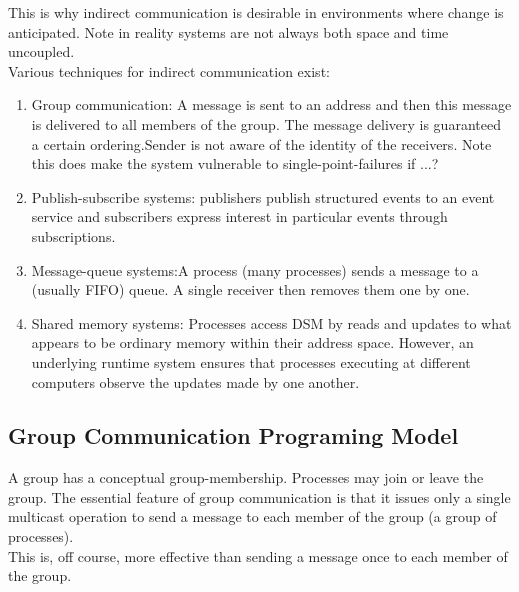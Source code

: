 This is why indirect communication is desirable in environments where change is anticipated. Note in reality systems are not always both space and time uncoupled. \\


Various techniques for indirect communication exist:\\

\begin{enumerate}
\item Group communication: A message is sent to an address  and then this message is delivered to all members of the group. The message delivery is guaranteed a certain ordering.Sender is not aware of the identity of the receivers. Note this does make the system vulnerable to single-point-failures if ...? \\

\item Publish-subscribe systems: publishers publish structured events to an event service and subscribers express interest in particular events through  subscriptions. \\

\item Message-queue systems:A process (many processes) sends a message to a (usually FIFO) queue. A single receiver then removes them one by one.\\

\item Shared memory systems: Processes access DSM by reads and updates to what appears to be ordinary memory within their address space. However, an underlying runtime system ensures that processes executing at different computers observe the updates made by one another.\\
\end{enumerate}

\subsection{Group Communication Programing Model}

A group has a conceptual group-membership. Processes may join or leave the group. The essential feature of group communication is that it issues only a single multicast operation to send a message to each member of the group (a group of processes). \\

This is, off course, more effective than sending a message once to each member of the group. \\

